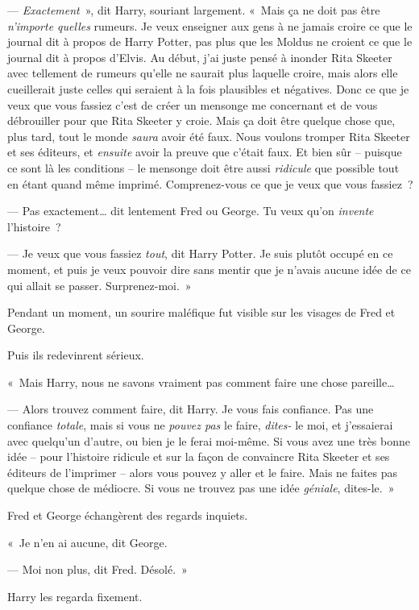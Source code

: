 --- \emph{Exactement}~», dit Harry, souriant largement. «~Mais ça ne doit pas être \emph{n'importe quelles} rumeurs. Je veux enseigner aux gens à ne jamais croire ce que le journal dit à propos de Harry Potter, pas plus que les Moldus ne croient ce que le journal dit à propos d'Elvis. Au début, j'ai juste pensé à inonder Rita Skeeter avec tellement de rumeurs qu'elle ne saurait plus laquelle croire, mais alors elle cueillerait juste celles qui seraient à la fois plausibles et négatives. Donc ce que je veux que vous fassiez c'est de créer un mensonge me concernant et de vous débrouiller pour que Rita Skeeter y croie. Mais ça doit être quelque chose que, plus tard, tout le monde \emph{saura} avoir été faux. Nous voulons tromper Rita Skeeter et ses éditeurs, et \emph{ensuite} avoir la preuve que c'était faux. Et bien sûr -- puisque ce sont là les conditions -- le mensonge doit être aussi \emph{ridicule} que possible tout en étant quand même imprimé. Comprenez-vous ce que je veux que vous fassiez~?

--- Pas exactement… dit lentement Fred ou George. Tu veux qu'on \emph{invente} l'histoire~?

--- Je veux que vous fassiez \emph{tout}, dit Harry Potter. Je suis plutôt occupé en ce moment, et puis je veux pouvoir dire sans mentir que je n'avais aucune idée de ce qui allait se passer. Surprenez-moi.~»

Pendant un moment, un sourire maléfique fut visible sur les visages de Fred et George.

Puis ils redevinrent sérieux.

«~Mais Harry, nous ne savons vraiment pas comment faire une chose pareille…

--- Alors trouvez comment faire, dit Harry. Je vous fais confiance. Pas une confiance \emph{totale}, mais si vous ne \emph{pouvez pas} le faire, \emph{dites-} le moi, et j'essaierai avec quelqu'un d'autre, ou bien je le ferai moi-même. Si vous avez une très bonne idée -- pour l'histoire ridicule et sur la façon de convaincre Rita Skeeter et ses éditeurs de l'imprimer -- alors vous pouvez y aller et le faire. Mais ne faites pas quelque chose de médiocre. Si vous ne trouvez pas une idée \emph{géniale}, dites-le.~»

Fred et George échangèrent des regards inquiets.

«~Je n'en ai aucune, dit George.

--- Moi non plus, dit Fred. Désolé.~»

Harry les regarda fixement.

